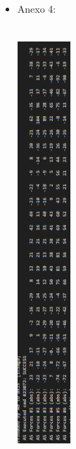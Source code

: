 \begin{itemize}
    \item Anexo 4:
        \\
        \\
        \vspace{3.5cm}
        \includegraphics[width=2cm,height=16cm]{figures/log_f_dist.png} \\
        \vspace{3.5cm}
\end{itemize}


